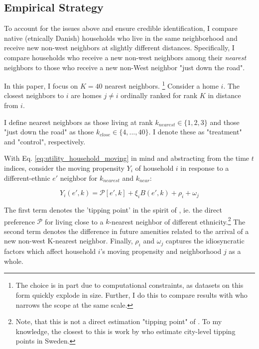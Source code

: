 \documentclass[../main.tex]{subfiles}
\begin{document}
\subsection{Empirical Strategy}
To account for the issues above and ensure credible identification, I compare native (etnically Danish) households who live in the same neighborhood and receive new non-west neighbors at slightly different distances. Specifically, I compare households who receive a new non-west neighbors among their \textit{nearest} neighbors to those who receive a new non-West neighbor "just down the road". 

In this paper, I focus on $K=40$ nearest neighbors.
\footnote{The choice is in part due to computational constraints, as datasets on this form quickly explode in size. Further, I do this to compare results with \textcite{Bayer_2022_nearest_neighbor} who narrows the scope at the same scale.} Consider a home $i$. The closest neighbors to $i$ are homes $j\neq i$ ordinally ranked for rank $K$ in distance from $i$.

I define nearest neighbors as those living at rank $k_{nearest}\in \{1, 2, 3\}$ and those "just down the road" as those $k_{close} \in \{4, ..., 40\}$. I denote these as "treatment" and "control", respectively.

With Eq. \ref{eq:utility_household_moving} in mind and abstracting from the time $t$ indices, consider the moving propensity $Y_i$ of household $i$ in response to a different-ethnic $e'$ neighbor for $k_{nearest}$ and $k_{near}$:

\begin{equation}
    Y_i(e', k) = \mathcal{P}[e', k] + \xi_i B(e', k) + \rho_i + \omega_j
\end{equation}

The first term denotes the 'tipping point' in the spirit of \textcite{schelling1971dynamic}, ie. the direct preference $\mathcal{P}$ for living close to a $k$-nearest neighbor of different ethnicity.\footnote{Note, that this is not a direct estimation "tipping point" of \textcite{schelling1971dynamic}. To my knowledge, the closest to this is work by \textcite{bohlmark_willen_2020_tipping} who estimate city-level tipping points in Sweden.}   The second term denotes the difference in future amenities related  to the arrival of a new non-west K-nearest neighbor. Finally, $\rho_i$ and $\omega_j$ captures the idiosyncratic factors which affect household $i$'s moving propensity and neighborhood $j$ as a whole. 
\end{document}
